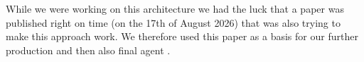 \documentclass[article, 10pt]{IEEEtran}
\begin{document}
While we were working on this architecture we had the luck that a paper was published right on time (on the 17th of August 2026) that was also trying to make this approach work. We therefore used this paper as a basis for our further production and then also final agent \cite{dong2026qwm}.




\end{document}
